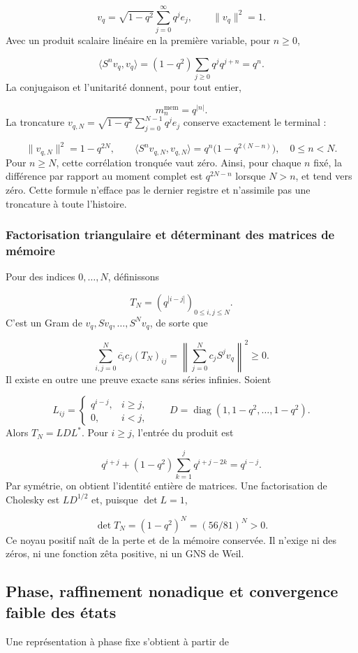 \[
v_q=\sqrt{1-q^2}\sum_{j=0}^{\infty}q^j e_j,
\qquad \|v_q\|^2=1.
\]
Avec un produit scalaire linéaire en la première variable, pour \(n\ge0\),

\[
\langle S^n v_q,v_q\rangle
=(1-q^2)\sum_{j\ge0}q^j q^{j+n}=q^n.
\]
La conjugaison et l'unitarité donnent, pour tout entier,

\[
\boxed{m_n^{\mathrm{mem}}=q^{|n|}.}
\]
La troncature \(v_{q,N}=\sqrt{1-q^2}\sum_{j=0}^{N-1}q^j e_j\) conserve exactement le terminal :

\[
\|v_{q,N}\|^2=1-q^{2N},\qquad
\langle S^n v_{q,N},v_{q,N}\rangle
=q^n\bigl(1-q^{2(N-n)}\bigr),\quad 0\le n<N.
\]
Pour \(n\ge N\), cette corrélation tronquée vaut zéro. Ainsi, pour chaque \(n\) fixé, la différence par rapport au moment complet est \(q^{2N-n}\) lorsque \(N>n\), et tend vers zéro. Cette formule n'efface pas le dernier registre et n'assimile pas une troncature à toute l'histoire.


\subsubsection{Factorisation triangulaire et déterminant des matrices de mémoire}
\label{tm-add-m2-2}
Pour des indices \(0,\ldots,N\), définissons

\[
T_N=(q^{|i-j|})_{0\le i,j\le N}.
\]
C'est un Gram de \(v_q,Sv_q,\ldots,S^Nv_q\), de sorte que

\[
\sum_{i,j=0}^{N}\overline{c_i}c_j(T_N)_{ij}
=\left\|\sum_{j=0}^{N}c_jS^jv_q\right\|^2\ge0.
\]
Il existe en outre une preuve exacte sans séries infinies. Soient

\[
L_{ij}=\begin{cases}q^{i-j},&i\ge j,\\0,&i<j,\end{cases}
\qquad D=\operatorname{diag}(1,1-q^2,\ldots,1-q^2).
\]
Alors \(T_N=LDL^*\). Pour \(i\ge j\), l'entrée du produit est

\[
q^{i+j}+(1-q^2)\sum_{k=1}^{j}q^{i+j-2k}
=q^{i-j}.
\]
Par symétrie, on obtient l'identité entière de matrices. Une factorisation de Cholesky est \(L D^{1/2}\) et, puisque \(\det L=1\),

\[
\boxed{\det T_N=(1-q^2)^N=(56/81)^N>0.}
\]
Ce noyau positif naît de la perte et de la mémoire conservée. Il n'exige ni des zéros, ni une fonction zêta positive, ni un GNS de Weil.


\subsection{Phase, raffinement nonadique et convergence faible des états}
\label{tm-add-m3}
Une représentation à phase fixe s'obtient à partir de

